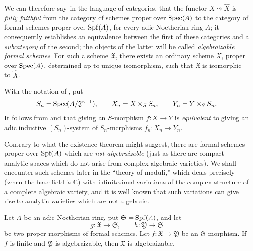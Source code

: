 We can therefore say, in the language of categories, that the functor
$X\leadsto\widehat{X}$ is \emph{fully faithful}
 from the category of schemes proper over
$\operatorname{Spec}(A)$ to the category of formal schemes proper over
$\operatorname{Spf}(A)$, for every adic Noetherian ring $A$; it consequently
establishes an equivalence between the first of these categories and a
\emph{subcategory} of the second; the objects of the latter will
be called \emph{algebraizable formal schemes}.  For
such a scheme $\mathfrak{X}$, there exists an ordinary
scheme $X$, proper over $\operatorname{Spec}(A)$, determined up to unique
isomorphism, such that $\mathfrak{X}$ is isomorphic to $\widehat{X}$.

\begin{scholium}[5.4.2]
\label{III.5.4.2}
With the notation of , put
\[
  S_n=\operatorname{Spec}(A/\mathfrak{J}^{n+1}),\qquad
  X_n=X\times_S S_n,\qquad
  Y_n=Y\times_S S_n.
\]
It follows from  and  that
giving an $S$-morphism $f:X\to Y$ is \emph{equivalent} to giving an adic
inductive $(S_n)$-system  of
$S_n$-morphisms $f_n:X_n\to Y_n$.
\end{scholium}

\begin{remark}[5.4.3]
\label{III.5.4.3}
Contrary to what the existence theorem  might
suggest, there are formal schemes proper over $\operatorname{Spf}(A)$ which
are \emph{not algebraizable} (just as there are compact analytic
spaces which do not arise from complex algebraic varieties).  We
shall encounter such schemes later in the ``theory of moduli,''
which deals precisely (when the base field is $\mathbb{C}$) with
infinitesimal variations of the complex structure of a complete
algebraic variety, and it is well known that such variations can give
rise to analytic varieties which are not algebraic.
\end{remark}

\begin{proposition}[5.4.4]
\label{III.5.4.4}
Let $A$ be an adic Noetherian ring, put
$\mathfrak{S}=\operatorname{Spf}(A)$, and let
\[
  g:\mathfrak{X}\to\mathfrak{S},
  \qquad
  h:\mathfrak{Y}\to\mathfrak{S}
\]
be two proper morphisms of formal schemes.  Let
$f:\mathfrak{X}\to\mathfrak{Y}$ be an
$\mathfrak{S}$-morphism.  If $f$ is finite and
$\mathfrak{Y}$ is algebraizable, then $\mathfrak{X}$ is
algebraizable.
\end{proposition}

